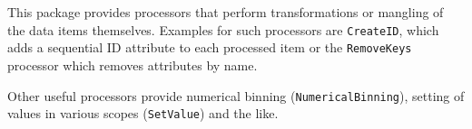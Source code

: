 This package provides processors that perform transformations or
mangling of the data items themselves. Examples for such processors are
\texttt{CreateID}, which adds a sequential ID attribute to each
processed item or the \texttt{RemoveKeys} processor which removes
attributes by name.

Other useful processors provide numerical binning
(\texttt{NumericalBinning}), setting of values in various scopes
(\texttt{SetValue}) and the like.


%
%
%
%
%
%
%
%
%
%
%
%
%
%
%
%
%

